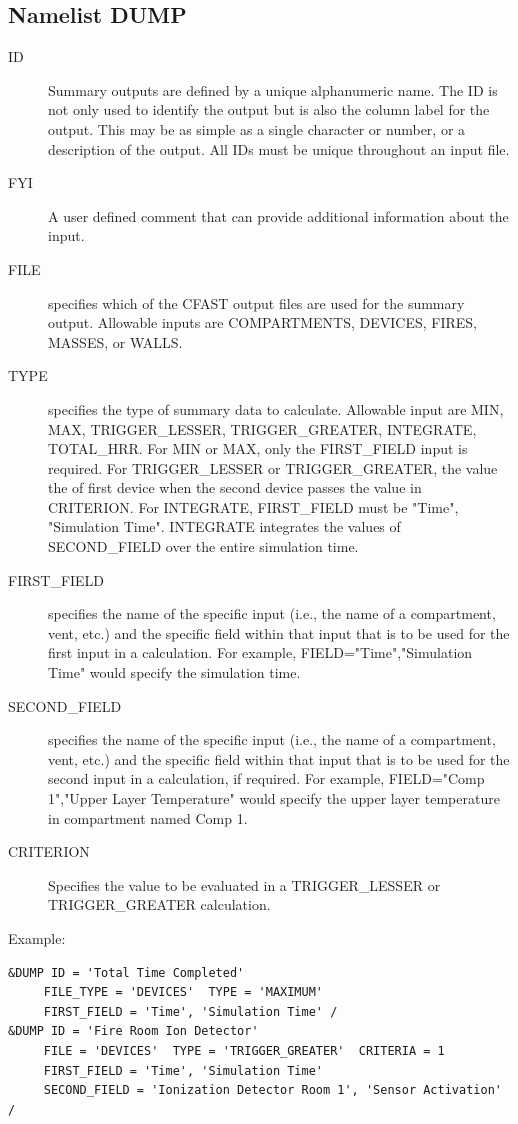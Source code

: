 \documentclass[12pt,twoside]{book}
\begin{document}
\subsection{Namelist DUMP}

\begin{description}
  \item[ID] Summary outputs are defined by a unique alphanumeric name. The ID is not only used to identify the output but is also the column label for the output. This may be as simple as a single character or number, or a description of the output. All IDs must be unique throughout an input file.
  \item[FYI] A user defined comment that can provide additional information about the input.
  \item[FILE] specifies which of the CFAST output files are used for the summary output. Allowable inputs are {\ct COMPARTMENTS}, {\ct DEVICES}, {\ct FIRES}, {\ct MASSES}, or {\ct WALLS}.
  \item[TYPE] specifies the type of summary data to calculate. Allowable input are {\ct MIN}, {\ct MAX}, {\ct TRIGGER\_LESSER}, {\ct TRIGGER\_GREATER}, {\ct INTEGRATE}, {\ct TOTAL\_HRR}. For {\ct MIN} or {\ct MAX}, only the {\ct FIRST\_FIELD} input is required. For {\ct TRIGGER\_LESSER} or {\ct TRIGGER\_GREATER}, the value the of first device when the second device passes the value in {\ct CRITERION}. For {\ct INTEGRATE}, {\ct FIRST\_FIELD} must be {\ct "Time", "Simulation Time"}. {\ct INTEGRATE} integrates the values of {\ct SECOND\_FIELD} over the entire simulation time.
  \item[FIRST\_FIELD] specifies the name of the specific input (i.e., the name of a compartment, vent, etc.) and the specific field within that input that is to be used for the first input in a calculation. For example, {\ct FIELD="Time","Simulation Time"} would specify the simulation time.
  \item[SECOND\_FIELD] specifies the name of the specific input (i.e., the name of a compartment, vent, etc.) and the specific field within that input that is to be used for the second input in a calculation, if required. For example, {\ct FIELD="Comp 1","Upper Layer Temperature"} would specify the upper layer temperature in compartment named {\ct Comp 1}.
  \item[CRITERION] Specifies the value to be evaluated in a {\ct TRIGGER\_LESSER} or {\ct TRIGGER\_GREATER} calculation.
\end{description}

\vspace{\baselineskip}
\noindent Example:
\begin{lstlisting}
&DUMP ID = 'Total Time Completed'
     FILE_TYPE = 'DEVICES'  TYPE = 'MAXIMUM'
     FIRST_FIELD = 'Time', 'Simulation Time' /
&DUMP ID = 'Fire Room Ion Detector'
     FILE = 'DEVICES'  TYPE = 'TRIGGER_GREATER'  CRITERIA = 1
     FIRST_FIELD = 'Time', 'Simulation Time'
     SECOND_FIELD = 'Ionization Detector Room 1', 'Sensor Activation' /
\end{lstlisting}
\end{document}

